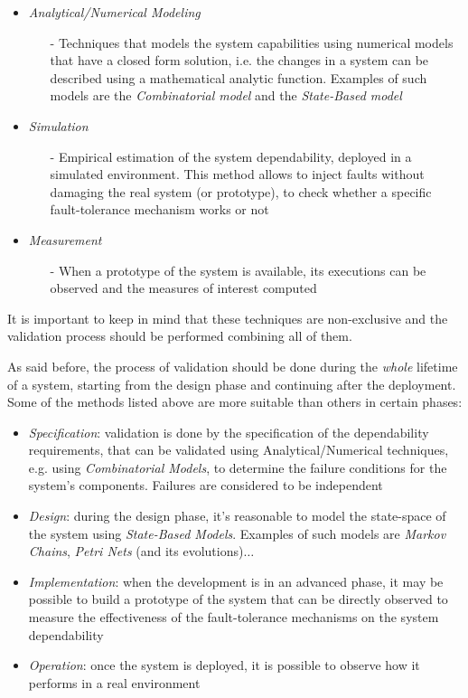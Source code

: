\begin{itemize}
	\item \textsl{Analytical/Numerical Modeling}
	\begin{itemize}
		\item[-] Techniques that models the system capabilities using numerical models that have a closed form solution, i.e. the changes in a system can be described using a mathematical analytic function. Examples of such models are the \textsl{Combinatorial model} and the \textsl{State-Based model}
	\end{itemize}
	\item \textsl{Simulation}
	\begin{itemize}
		\item[-] Empirical estimation of the system dependability, deployed in a simulated environment. This method allows to inject faults without damaging the real system (or prototype), to check whether a specific fault-tolerance mechanism works or not		
	\end{itemize}
	\item \textsl{Measurement}
	\begin{itemize}
		\item[-] When a prototype of the system is available, its executions can be observed and the measures of interest computed
	\end{itemize}
\end{itemize}

It is important to keep in mind that these techniques are non-exclusive and the validation process should be performed combining all of them.

As said before, the process of validation should be done during the \textsl{whole} lifetime of a system, starting from the design phase and continuing after the deployment. Some of the methods listed above are more suitable than others in certain phases:

\begin{itemize}
	\item \textsl{Specification}: validation is done by the specification of the dependability requirements, that can be validated using Analytical/Numerical techniques, e.g. using \textsl{Combinatorial Models}, to determine the failure conditions for the system's components. Failures are considered to be independent
	\item \textsl{Design}: during the design phase, it's reasonable to model the state-space of the system using \textsl{State-Based Models}. Examples of such models are \textsl{Markov Chains}, \textsl{Petri Nets} (and its evolutions)$\dots$
	\item \textsl{Implementation}: when the development is in an advanced phase, it may be possible to build a prototype of the system that can be directly observed to measure the effectiveness of the fault-tolerance mechanisms on the system dependability
	\item \textsl{Operation}: once the system is deployed, it is possible to observe how it performs in a real environment
\end{itemize}

